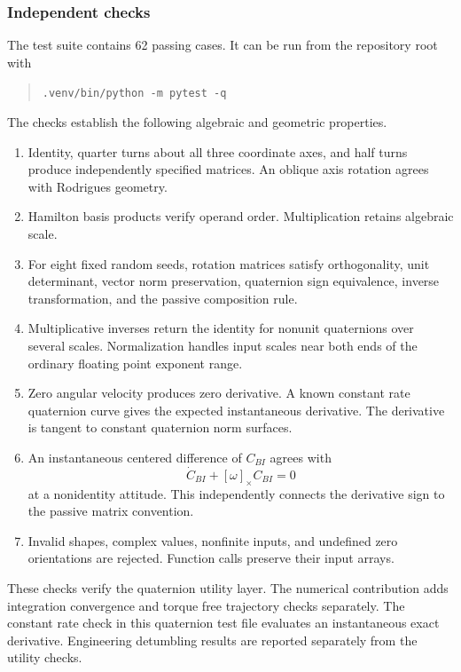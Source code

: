 \subsubsection{Independent checks}
The test suite contains 62 passing cases. It can be run from the repository root with
\begin{quote}
\texttt{.venv/bin/python \string-m pytest \string-q}
\end{quote}
The checks establish the following algebraic and geometric properties.
\begin{enumerate}
\item Identity, quarter turns about all three coordinate axes, and half turns produce independently specified matrices. An oblique axis rotation agrees with Rodrigues geometry.
\item Hamilton basis products verify operand order. Multiplication retains algebraic scale.
\item For eight fixed random seeds, rotation matrices satisfy orthogonality, unit determinant, vector norm preservation, quaternion sign equivalence, inverse transformation, and the passive composition rule.
\item Multiplicative inverses return the identity for nonunit quaternions over several scales. Normalization handles input scales near both ends of the ordinary floating point exponent range.
\item Zero angular velocity produces zero derivative. A known constant rate quaternion curve gives the expected instantaneous derivative. The derivative is tangent to constant quaternion norm surfaces.
\item An instantaneous centered difference of \(C_{BI}\) agrees with
\[
\dot C_{BI}+[\omega]_\times C_{BI}=0
\]
at a nonidentity attitude. This independently connects the derivative sign to the passive matrix convention.
\item Invalid shapes, complex values, nonfinite inputs, and undefined zero orientations are rejected. Function calls preserve their input arrays.
\end{enumerate}
These checks verify the quaternion utility layer. The numerical contribution adds integration convergence and torque free trajectory checks separately. The constant rate check in this quaternion test file evaluates an instantaneous exact derivative. Engineering detumbling results are reported separately from the utility checks.
